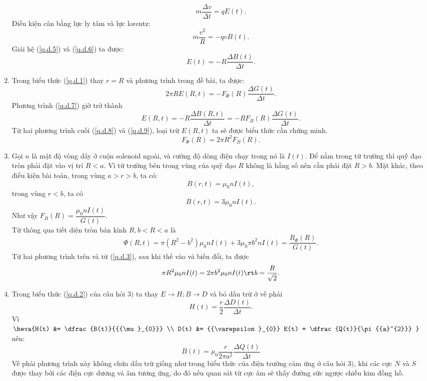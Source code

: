 \begin{loigiai}
\begin{enumerate}[1)]
    \[m\dfrac{\Delta v}{\Delta t} = qE(t).\tag{5}\label{q.d.5}\] 
    Điều kiện cân bằng lực ly tâm và lực lorentz:
    \[m\dfrac{{{v}^{2}}}{R}=-qvB(t)\tag{6}\label{q.d.6}.\]
    Giải hệ (\ref{q.d.5}) và (\ref{q.d.6}) ta được: \[E(t)=-R\dfrac{\Delta B(t)}{\Delta t}. \tag{7}\label{q.d.7}\]
    \item Trong biểu thức (\ref{q.d.1}) thay $r = R$ và phương trình trong đề bài, ta được: 
    \[2\pi R E(R,t) = -{{F}_{\Phi }}(R) \dfrac{\Delta G(t)}{\Delta t}. \tag{8}\label{q.d.8}\]
    Phương trình (\ref{q.d.7}) giờ trở thành
    \[E(R,t) = -R\dfrac{\Delta B(R,t)}{\Delta t} = -R{{F}_{B}}(R)\dfrac{\Delta G(t)}{\Delta t}. \tag{9}\label{q.d.9}\]
    Từ hai phương trình cuối (\ref{q.d.8}) và (\ref{q.d.9}), loại trừ $E(R,t)$ ta sẽ được biểu thức cần chứng minh.
   \[F_{\Phi}(R) = 2 \pi R^{2} F_{B}({R}).\]
   \item Gọi $n$ là mật độ vòng dây ở cuộn solenoid ngoài, và cường độ dòng điện chạy trong nó là $I(t)$. Để nằm trong từ trường thì quỹ đạo tròn phải đặt vào vị trí $R<a$. Vì từ trường bên trong vùng của quỹ đạo $R$ không là hằng số nên cần phải đặt $R>b$. Mặt khác, theo điều kiện bài toán, trong vùng $a>r>b$, ta có: \[B(r,t)={{\mu }_{0}}nI(t),\] trong vùng $r<b$, ta có \[B(r,t)=3{{\mu }_{0}}nI(t).\] Như vậy $F_B(R) = \dfrac{{{\mu }_{0}}nI(t)}{G(t)}$.\\  
    Từ thông qua tiết diện tròn bán kính $R, b<R<a$ là
    \[\Phi(R,t) = \pi ({{R}^{2}}-{{b}^{2}}){{\mu }_{0}}nI(t)+3{{\mu }_{0}}\pi{{b}^{2}}nI(t) = \dfrac{R_\Phi(R)}{G(t)}.\] 
    Từ hai phương trình trên và từ (\ref{q.d.3}), sau khi thế vào và biến đổi, ta được
    \[\pi {{R}^{2}}{{\mu }_{0}}nI(t) =  2\pi {{b}^{2}}{{\mu }_{0}}nI(t) \rt b = \dfrac{R}{\sqrt{2}}.\]
    \item Trong biểu thức (\ref{q.d.2}) của câu hỏi $3)$ ta thay $E\to H; B\to D$  và bỏ dấu trừ ở vế phải
    \[H(t)=\dfrac{r}{2}\dfrac{\Delta D(t)}{\Delta t}.\] 
    Vì $\heva{H(t) &= \dfrac{B(t)}{{{\mu }_{0}}} \\ D(t) &= {{\varepsilon }_{0}} E(t) = \dfrac{Q(t)}{\pi {{a}^{2}}} }$  nên:
    \[B(t)={{\mu }_{0}}\frac{r}{2\pi {{a}^{2}}}\dfrac{\Delta Q(t)}{\Delta t}\]  
    Vế phải phương trình này không chứa dấu trừ giống như trong biểu thức của điện trường cảm ứng ở câu hỏi $3)$, khi các cực $N$ và $S$ được thay bởi các điện cực dương và âm tương ứng, do đó nếu quan sát từ cực âm sẽ thấy đường sức ngược chiều kim đồng hồ.
\end{enumerate}
\end{loigiai}


